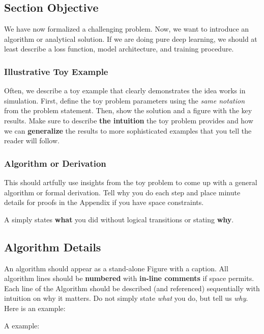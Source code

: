 \subsection{Section Objective}
We have now formalized a challenging problem. Now, we want to introduce an algorithm or analytical solution. If we are doing pure deep learning, we should at least describe a loss function, model architecture, and training procedure. 

\subsubsection{Illustrative Toy Example}
Often, we describe a toy example that clearly demonstrates the idea works in simulation. First, define the toy problem parameters using the \textit{same notation} from the problem statement. Then, show the solution and a figure with the key results. Make sure to describe \textbf{the intuition} the toy problem provides and how we can \textbf{generalize} the results to more sophisticated examples that you tell the reader will follow.

\subsubsection{Algorithm or Derivation}
This should artfully use insights from the toy problem to come up with a general algorithm or formal derivation. Tell why you do each step and place minute details for proofs in the Appendix if you have space constraints. 

A  simply states \textbf{what} you did without logical transitions or stating \textbf{why}.

\subsection{Algorithm Details}
An algorithm should appear as a stand-alone Figure with a caption. 
All algorithm lines should be \textbf{numbered} with \textbf{in-line comments} if space permits. Each line of the Algorithm should be described (and referenced) sequentially with intuition on why it matters. Do not simply state \textit{what} you do, but tell us \textit{why}. Here is an example: 

A  example: 
\begin{quote}
\end{quote}
